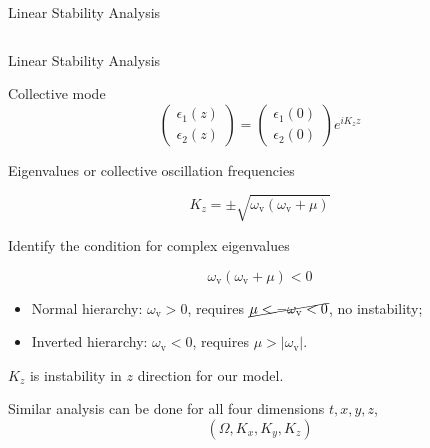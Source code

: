 \documentclass[9pt]{beamer}
\begin{document}
\begin{darkframes}
\begin{frame}{Linear Stability Analysis}
\begin{columns}[T]
\begin{column}{0.45\textwidth}
\end{column}%
\end{columns}



\end{frame}


\begin{frame}{Linear Stability Analysis}


Collective mode
\begin{equation*}
   \begin{pmatrix}
      \epsilon_1(z)\\
      \epsilon_2(z)
   \end{pmatrix} = \begin{pmatrix}
      \epsilon_1(0)\\
      \epsilon_2(0)
   \end{pmatrix} e^{i K_z z}
\end{equation*}


Eigenvalues or collective oscillation frequencies

\begin{equation*}
   K_z = \pm \sqrt{ \omega_{\mathrm v} ( \omega_{\mathrm v}+ \mu ) }
\end{equation*}

Identify the condition for complex eigenvalues

\begin{equation*}
   \omega_{\mathrm v} ( \omega_{\mathrm v}+ \mu ) < 0
\end{equation*}

\pause

\begin{itemize}
   \item Normal hierarchy: $\omega_{\mathrm v}>0$, requires $\cancel{ \mu  < -\omega_{\mathrm v} <0}$, no instability;
   \item Inverted hierarchy: $\omega_{\mathrm v}<0$, requires $\mu >\lvert \omega_{\mathrm v}\rvert$.
\end{itemize}

\pause

\begin{tcolorbox}
    \center
    $K_z$ is instability in $z$ direction for our model.
\end{tcolorbox}

\pause

\begin{tcolorbox}
    \centering
    Similar analysis can be done for all four dimensions $t, x, y, z$,
    \begin{equation*}
        \left( \Omega, K_x, K_y, K_z \right)
    \end{equation*}


\end{tcolorbox}
\end{frame}
\end{darkframes}
\end{document}
